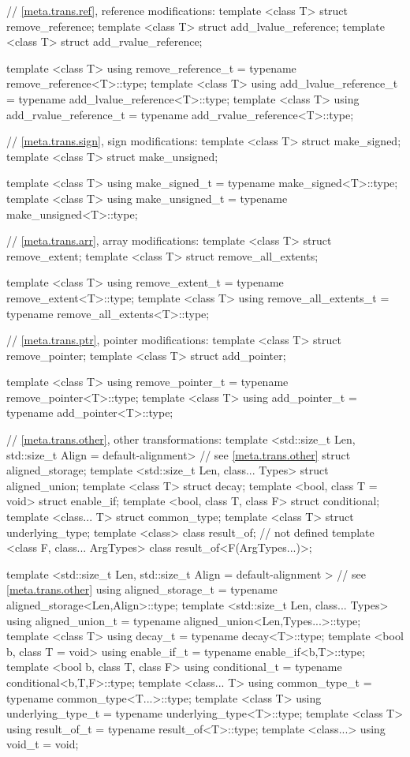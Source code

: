 \begin{codeblock}
{  // \ref{meta.trans.ref}, reference modifications:
  template <class T> struct remove_reference;
  template <class T> struct add_lvalue_reference;
  template <class T> struct add_rvalue_reference;

  template <class T>
    using remove_reference_t     = typename remove_reference<T>::type;
  template <class T>
    using add_lvalue_reference_t = typename add_lvalue_reference<T>::type;
  template <class T>
    using add_rvalue_reference_t = typename add_rvalue_reference<T>::type;

  // \ref{meta.trans.sign}, sign modifications:
  template <class T> struct make_signed;
  template <class T> struct make_unsigned;

  template <class T>
    using make_signed_t   = typename make_signed<T>::type;
  template <class T>
    using make_unsigned_t = typename make_unsigned<T>::type;

  // \ref{meta.trans.arr}, array modifications:
  template <class T> struct remove_extent;
  template <class T> struct remove_all_extents;

  template <class T>
    using remove_extent_t      = typename remove_extent<T>::type;
  template <class T>
    using remove_all_extents_t = typename remove_all_extents<T>::type;

  // \ref{meta.trans.ptr}, pointer modifications:
  template <class T> struct remove_pointer;
  template <class T> struct add_pointer;

  template <class T>
    using remove_pointer_t = typename remove_pointer<T>::type;
  template <class T>
    using add_pointer_t    = typename add_pointer<T>::type;

  // \ref{meta.trans.other}, other transformations:
  template <std::size_t Len,
            std::size_t Align = default-alignment>   // see \ref{meta.trans.other}
    struct aligned_storage;      
  template <std::size_t Len, class... Types> struct aligned_union;
  template <class T> struct decay;
  template <bool, class T = void> struct enable_if;
  template <bool, class T, class F> struct conditional;
  template <class... T> struct common_type;
  template <class T> struct underlying_type;
  template <class> class result_of;   // not defined
  template <class F, class... ArgTypes> class result_of<F(ArgTypes...)>;

  template <std::size_t Len,
            std::size_t Align = default-alignment > // see \ref{meta.trans.other}
    using aligned_storage_t = typename aligned_storage<Len,Align>::type;
  template <std::size_t Len, class... Types>
    using aligned_union_t   = typename aligned_union<Len,Types...>::type;
  template <class T>
    using decay_t           = typename decay<T>::type;
  template <bool b, class T = void>
    using enable_if_t       = typename enable_if<b,T>::type;
  template <bool b, class T, class F>
    using conditional_t     = typename conditional<b,T,F>::type;
  template <class... T>
    using common_type_t     = typename common_type<T...>::type;
  template <class T>
    using underlying_type_t = typename underlying_type<T>::type;
  template <class T>
    using result_of_t       = typename result_of<T>::type;  
  template <class...>
    using void_t            = void;

}
\end{codeblock}

